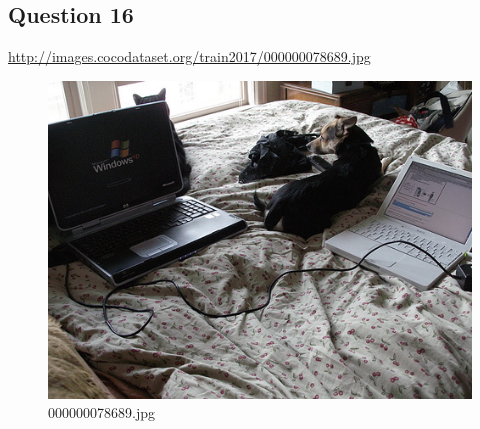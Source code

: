\subsection*{Question 16}
\url{http://images.cocodataset.org/train2017/000000078689.jpg}
    \begin{figure}[h]
        \centering
        \includegraphics[width=0.8\linewidth]{../image set/easy/000000078689.jpg}
        \caption{000000078689.jpg}
    \end{figure}
